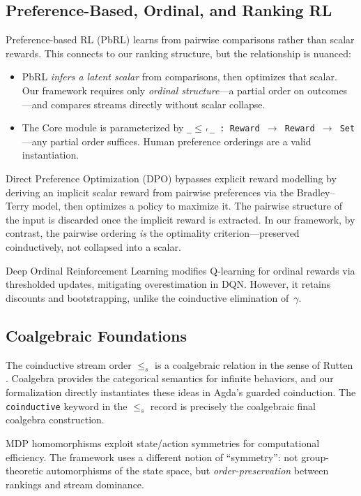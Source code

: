 \documentclass[9pt,a4paper]{article}
\theoremstyle{plain}
\theoremstyle{definition}
\theoremstyle{remark}
\begin{document}
\subsection{Preference-Based, Ordinal, and Ranking RL}

Preference-based RL (PbRL) \cite{Wirth2017} learns from pairwise comparisons rather than scalar rewards.  This connects to our ranking structure, but the relationship is nuanced:
\begin{itemize}
\item PbRL \emph{infers a latent scalar} from comparisons, then optimizes that scalar.  Our framework requires only \emph{ordinal structure}---a partial order on outcomes---and compares streams directly without scalar collapse.
\item The Core module is parameterized by \texttt{\_$\le$ᵣ\_ : Reward $\to$ Reward $\to$ Set}---any partial order suffices.  Human preference orderings are a valid instantiation.
\end{itemize}

\noindent Direct Preference Optimization (DPO) \cite{Rafailov2023} bypasses explicit reward modelling by deriving an implicit scalar reward from pairwise preferences via the Bradley--Terry model, then optimizes a policy to maximize it.  The pairwise structure of the input is discarded once the implicit reward is extracted.  In our framework, by contrast, the pairwise ordering \emph{is} the optimality criterion---preserved coinductively, not collapsed into a scalar.

Deep Ordinal Reinforcement Learning \cite{Zap2019} modifies Q-learning for ordinal rewards via thresholded updates, mitigating overestimation in DQN.  However, it retains discounts and bootstrapping, unlike the coinductive elimination of~$\gamma$.

\subsection{Coalgebraic Foundations}

The coinductive stream order $\le_s$ is a coalgebraic relation in the sense of Rutten \cite{Rutten2000}.  Coalgebra provides the categorical semantics for infinite behaviors, and our formalization directly instantiates these ideas in Agda's guarded coinduction.  The \texttt{coinductive} keyword in the $\le_s$ record is precisely the coalgebraic final coalgebra construction.

MDP homomorphisms \cite{vanderPol2020} exploit state/action symmetries for computational efficiency.  The framework uses a different notion of ``symmetry'': not group-theoretic automorphisms of the state space, but \emph{order-preservation} between rankings and stream dominance.
\end{document}
